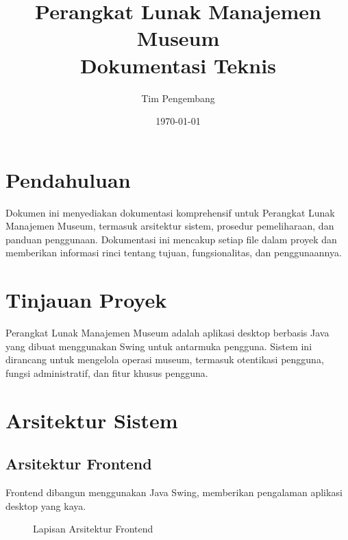 \documentclass[12pt,a4paper]{article}
\title{Perangkat Lunak Manajemen Museum\\Dokumentasi Teknis}
\author{Tim Pengembang}
\date{\today}
\begin{document}
\maketitle
\tableofcontents
\newpage

\section{Pendahuluan}
Dokumen ini menyediakan dokumentasi komprehensif untuk Perangkat Lunak Manajemen Museum, termasuk arsitektur sistem, prosedur pemeliharaan, dan panduan penggunaan. Dokumentasi ini mencakup setiap file dalam proyek dan memberikan informasi rinci tentang tujuan, fungsionalitas, dan penggunaannya.

\section{Tinjauan Proyek}
Perangkat Lunak Manajemen Museum adalah aplikasi desktop berbasis Java yang dibuat menggunakan Swing untuk antarmuka pengguna. Sistem ini dirancang untuk mengelola operasi museum, termasuk otentikasi pengguna, fungsi administratif, dan fitur khusus pengguna.

\section{Arsitektur Sistem}

\subsection{Arsitektur Frontend}
Frontend dibangun menggunakan Java Swing, memberikan pengalaman aplikasi desktop yang kaya.

\begin{figure}[h]
\centering
{}
\caption{Lapisan Arsitektur Frontend}
\end{figure}
\end{document}
